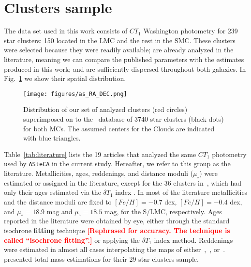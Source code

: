 \documentclass[draft]{aa}
\newcommand{\LEt}[1]{\textcolor{red}{\textbf{[#1]}}}
\renewcommand{\includegraphics}[2][]{}
\begin{document}

\section{Clusters sample}
\label{sec:clust-sample}

The data set used in this work consists of $CT_1$ Washington photometry for 239
star clusters: 150 located in the LMC and the rest in the SMC.\@
%
These clusters were selected because they were readily available; are
already analyzed in the literature, meaning we can compare the published
parameters with the estimates produced in this work; and are sufficiently
dispersed throughout both galaxies. In Fig.~\ref{fig:ra-dec} we show their
spatial distribution.

\begin{figure}
\centering
\texttt{[image: figures/as\_RA\_DEC.png]}
\caption{Distribution of our set of analyzed clusters (red circles)
superimposed on to the~\cite{Bica_2008} database of 3740 star clusters (black
dots) for both MCs. The assumed centers for the Clouds are indicated with blue
triangles.}
\label{fig:ra-dec}
\end{figure}

Table~\ref{tab:literature} lists the 19 articles that analyzed the same
$CT_1$ photometry used by \texttt{ASteCA} in the current study. Hereafter, we
refer to this group as the literature.
%
Metallicities, ages, reddenings, and distance moduli ($\mu_{\circ}$)
were estimated or assigned in the literature, except for the 36
clusters in~\cite{Piatti_2011b}, which had only their ages estimated
via the $\delta T_1$ index \citep{Phelps_1994,Geisler_1997}.
%
In most of the literature metallicities and the distance moduli are fixed to
$[Fe/H]{=}-0.7$ dex, $[Fe/H]{=}-0.4$ dex, and $\mu_{\circ}{=}18.9$ mag and
$\mu_{\circ}{=}18.5$ mag, for the S/LMC, respectively.
Ages reported in the literature were obtained by eye, either through
the standard isochrone \textbf{fitting} technique \LEt{Rephrased for accuracy.
The technique is called ``isochrone fitting''.} or applying the $\delta T_1$
index method.
Reddenings were estimated in almost all cases interpolating the maps
of either~\cite{Burstein_1982},~\cite{Schlegel_1998}, or~\cite{Haschke_2011}.
\cite{Maia_2013} presented total mass estimations for their 29 star clusters
sample.
\end{document}

